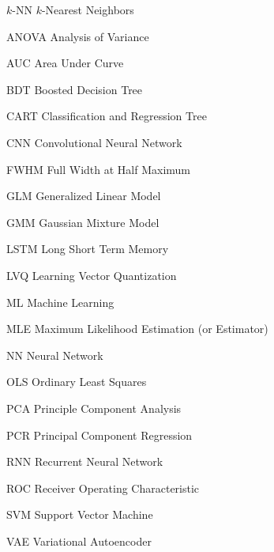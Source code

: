 \begin{symbollist}
	\item[$k$-NN] $k$-Nearest Neighbors
	\item[ANOVA] Analysis of Variance
	\item[AUC] Area Under Curve
	\item[BDT] Boosted Decision Tree
	\item[CART] Classification and Regression Tree
	\item[CNN] Convolutional Neural Network
	\item[FWHM] Full Width at Half Maximum
	\item[GLM] Generalized Linear Model
	\item[GMM] Gaussian Mixture Model
	\item[LSTM] Long Short Term Memory
	\item[LVQ] Learning Vector Quantization
	\item[ML] Machine Learning
	\item[MLE] Maximum Likelihood Estimation (or Estimator)
	\item[NN] Neural Network
	\item[OLS] Ordinary Least Squares
	\item[PCA] Principle Component Analysis
	\item[PCR] Principal Component Regression
	\item[RNN] Recurrent Neural Network
	\item[ROC] Receiver Operating Characteristic
	\item[SVM] Support Vector Machine
	\item[VAE] Variational Autoencoder
\end{symbollist}
